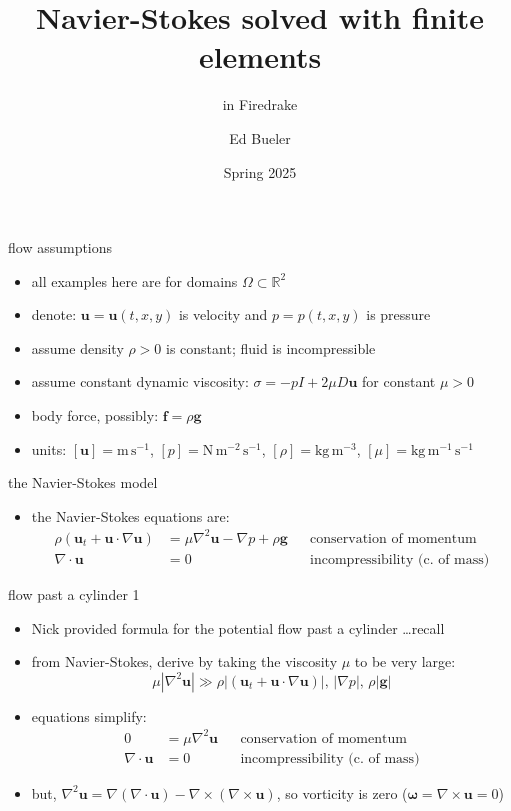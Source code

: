 \documentclass[10pt,hyperref]{beamer}
\title{Navier-Stokes solved with finite elements}
\subtitle{in Firedrake}
\author{Ed Bueler}
\institute{MATH 692 Fluids \& Solids Seminar}
\date{Spring 2025}
\newcommand{\bbf}{\mathbf{f}}
\newcommand{\bg}{\mathbf{g}}
\newcommand{\bu}{\mathbf{u}}
\newcommand{\grad}{\nabla}
\newcommand{\Div}{\nabla\cdot}
\newcommand{\Curl}{\nabla\times}
\newcommand{\RR}{\mathbb{R}}
\begin{document}
\beamertemplatenavigationsymbolsempty

\begin{frame}
  \maketitle
\end{frame}


\begin{frame}{flow assumptions}

\begin{itemize}
\item all examples here are for domains $\Omega \subset \RR^2$
\item denote: $\bu=\bu(t,x,y)$ is velocity and $p=p(t,x,y)$ is pressure
\item assume density $\rho>0$ is constant; fluid is incompressible
\item assume constant dynamic viscosity: $\sigma = -p I + 2 \mu D\bu$ for constant $\mu>0$
\item body force, possibly: $\bbf = \rho \bg$
\item units: $[\bu]=\text{m}\,\text{s}^{-1}$, $[p]=\text{N}\,\text{m}^{-2}\,\text{s}^{-1}$, $[\rho]=\text{kg}\,\text{m}^{-3}$, $[\mu]=\text{kg}\,\text{m}^{-1}\,\text{s}^{-1}$
\end{itemize}
\end{frame}


\begin{frame}{the Navier-Stokes model}

\begin{itemize}
\item the Navier-Stokes equations are:
\begin{align*}
\rho\left(\bu_t + \bu \cdot \grad \bu\right) &= \mu \grad^2 \bu - \grad p + \rho \bg & &\text{conservation of momentum} \\
\Div \bu &= 0 & &\text{incompressibility (c.~of mass)}
\end{align*}
\end{itemize}
\end{frame}


\begin{frame}{flow past a cylinder 1}

\begin{itemize}
\item Nick provided formula for the potential flow past a cylinder \dots recall
\item from Navier-Stokes, derive by taking the viscosity $\mu$ to be very large:
	$$\mu |\grad^2 \bu| \gg \rho|\left(\bu_t + \bu \cdot \grad \bu\right)|,\, |\grad p|,\, \rho |\bg|$$
\item equations simplify:
\begin{align*}
0 &= \mu \grad^2 \bu & &\text{conservation of momentum} \\
\Div \bu &= 0 & &\text{incompressibility (c.~of mass)}
\end{align*}
\item but, $\grad^2 \bu = \grad\left(\Div \bu\right) - \Curl(\Curl \bu)$, so vorticity is zero ($\bm{\omega}=\Curl\bu=0$)
\end{itemize}
\end{frame}
\end{document}

